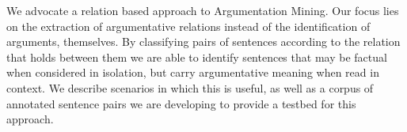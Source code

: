 We advocate a relation based approach to Argumentation Mining. Our focus lies on the extraction of argumentative relations instead of the identification of arguments, themselves. By classifying pairs of sentences according to the relation that holds between them we are able to identify sentences that may be factual when considered in isolation, but carry argumentative meaning when read in context. We describe scenarios in which this is useful, as well as a corpus of annotated sentence pairs we are developing to provide a testbed for this approach.
